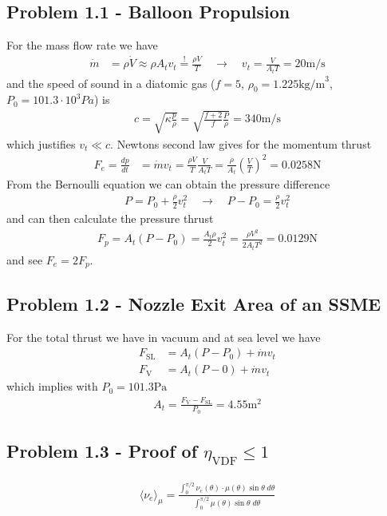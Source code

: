 \documentclass[10pt,a4paper]{book}
\theoremstyle{definition}
\begin{document}
\subsection{Problem 1.1 - Balloon Propulsion}
For the mass flow rate we have
\begin{align}
    \dot{m}&=\rho\dot{V}\approx\rho A_t v_t \stackrel{!}{=} \frac{\rho V}{T}\quad\rightarrow\quad v_t=\frac{V}{A_tT}=20\text{m/s}
\end{align}
and the speed of sound in a diatomic gas ($f=5$, $\rho_0=1.225\text{kg/m}^3$, $P_0=101.3\cdot10^3Pa$) is
\begin{align}
    c=\sqrt{\kappa\frac{p}{\rho}}=\sqrt{\frac{f+2}{f}\frac{P}{\rho}}=340\text{m/s}
\end{align}
which justifies $v_t\ll c$. Newtons second law gives for the momentum thrust
\begin{align}
    F_e=\frac{dp}{dt}&=\dot{m}v_t=\frac{\rho V}{T}\frac{V}{A_t T}=\frac{\rho}{A_t}\left(\frac{V}{T}\right)^2=0.0258\text{N}
\end{align}
From the Bernoulli equation we can obtain the pressure difference
\begin{align}
    P = P_0+\frac{\rho}{2}v_t^2\quad\rightarrow\quad P - P_0=\frac{\rho}{2}v_t^2
\end{align}
and can then calculate the pressure thrust
\begin{align}
    F_p=A_t(P-P_0)=\frac{A_t\rho}{2}v_t^2=\frac{\rho V^2}{2A_tT^2}=0.0129\text{N}
\end{align}
and see $F_e=2F_p$.


\subsection{Problem 1.2 - Nozzle Exit Area of an SSME}
For the total thrust we have in vacuum and at sea level we have
\begin{align}
    F_\text{SL}&=A_t(P-P_0) + \dot{m}v_t\\
    F_\text{V}&=A_t(P-0) + \dot{m}v_t
\end{align}
which implies with $P_0=101.3\text{Pa}$
\begin{align}
    A_t=\frac{F_\text{V}-F_\text{SL}}{P_0}=4.55\text{m}^2
\end{align}


\subsection{Problem 1.3 - Proof of \texorpdfstring{$\eta_\text{VDF}\le1$}{Lg} }
\begin{align}
    \langle \nu_e\rangle_\mu=\frac{\int_0^{\pi/2}\nu_e(\theta)\cdot\mu(\theta)\sin\theta\;d\theta}{\int_0^{\pi/2}\mu(\theta)\sin\theta\;d\theta}
\end{align}
\end{document}
